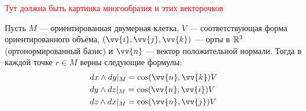 \textcolor{red}{Тут должна быть картинка многообразия и этих векторочков}

\begin{proposition}
	Пусть $M$ --- ориентированная двумерная клетка, $V$ --- соответствующая форма ориентированного объёма, $(\vv{i}, \vv{j}, \vv{k})$ --- орты в $\mathbb{R}^3$ (ортонормированный базис) и $\vv{n}$ --- вектор положительной нормали. Тогда в каждой точке $r \in M$ верны следующие формулы:
	\begin{align*}
		&{dx \wedge dy|_M = \cos(\vv{n}, \vv{k})V}
		\\
		&{dy \wedge dz|_M = \cos(\vv{n}, \vv{i})V}
		\\
		&{dz \wedge dx|_M = \cos(\vv{n}, \vv{j})V}
	\end{align*}
\end{proposition}

